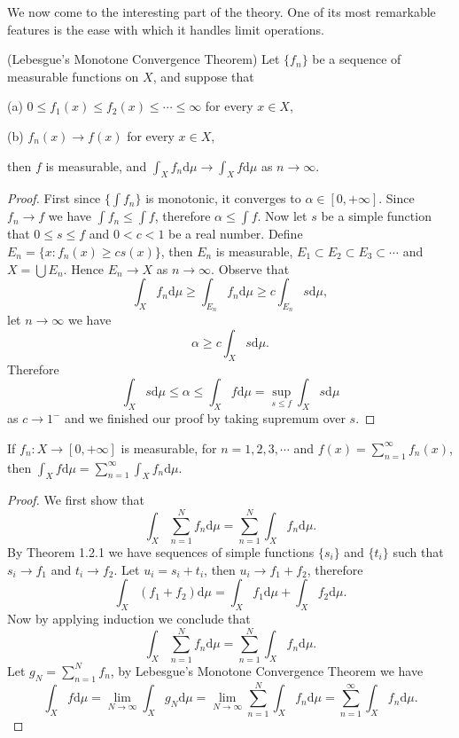 We now come to the interesting part of the theory. One of its most remarkable features is the ease with which it handles limit operations.
\begin{theorem}(Lebesgue's Monotone Convergence Theorem) Let $\{f_n\}$ be a sequence of measurable functions on $X$, and suppose that \par
(a) $0\le f_1(x)\le f_2(x)\le\cdots\le\infty$ for every $x\in X$,\par
(b) $f_n(x)\to f(x)$ for every $x\in X$,\par
then $f$ is measurable, and $\int_Xf_n\mathrm{d}\mu\to\int_Xf\mathrm{d}\mu$ as $n\to\infty$.
\end{theorem}
\begin{proof}
First since $\{\int f_n\}$ is monotonic, it converges to $\alpha\in [0,+\infty]$. Since $f_n\to f$ we have $\int f_n\le\int f$, therefore $\alpha\le\int f$. Now let $s$ be a simple function that $0\le s\le f$ and $0<c<1$ be a real number. Define $E_n=\{x:f_n(x)\ge cs(x)\}$, then $E_n$ is measurable, $E_1\subset E_2\subset E_3\subset \cdots $ and $X=\bigcup E_n$. Hence $E_n\to X$ as $n\to\infty$. Observe that 
$$
\int_X{f_n\mathrm{d}\mu}\ge \int_{E_n}{f_n\mathrm{d}\mu}\ge c\int_{E_n}{s\mathrm{d}\mu},
$$
let $n\to\infty$ we have 
$$
\alpha \ge c\int_X{s\mathrm{d}\mu}.
$$
Therefore 
$$
\int_X{s\mathrm{d}\mu}\le \alpha \le \int_X{f\mathrm{d}\mu}=\mathop {\mathrm{sup}} \limits_{s\le f}\int_X{s\mathrm{d}\mu}
$$
as $c\to 1^-$ and we finished our proof by taking supremum over $s$.
\end{proof}
\begin{theorem}
If $f_n:X\to[0,+\infty]$ is measurable, for $n=1,2,3,\cdots$ and $f(x)=\sum_{n=1}^\infty f_n(x)$, then $\int_Xf\mathrm{d}\mu=\sum_{n=1}^\infty\int_Xf_n\mathrm{d}\mu$.
\end{theorem}
\begin{proof}
We first show that 
$$
\int_X{\sum_{n=1}^N{f_n}\mathrm{d}\mu}=\sum_{n=1}^N{\int_X{f_n\mathrm{d}\mu}}.
$$
By Theorem 1.2.1 we have sequences of simple functions $\{s_i\}$ and $\{t_i\}$ such that $s_i\to f_1$ and $t_i\to f_2$. Let $u_i=s_i+t_i$, then $u_i\to f_1+f_2$, therefore 
$$
\int_X{\left( f_1+f_2 \right) \mathrm{d}\mu}=\int_X{f_1\mathrm{d}\mu}+\int_X{f_2\mathrm{d}\mu}.
$$
Now by applying induction we conclude that 
$$
\int_X{\sum_{n=1}^N{f_n}\mathrm{d}\mu}=\sum_{n=1}^N{\int_X{f_n\mathrm{d}\mu}}.
$$
Let $g_N=\sum_{n=1}^Nf_n$, by Lebesgue's Monotone Convergence Theorem we have 
$$
\int_X{f\mathrm{d}\mu}=\lim_{N\rightarrow \infty} \int_X{g_N\mathrm{d}\mu}=\lim_{N\rightarrow \infty} \sum_{n=1}^N{\int_X{f_n\mathrm{d}\mu}}=\sum_{n=1}^{\infty}{\int_X{f_n\mathrm{d}\mu}}.
$$
\end{proof}
